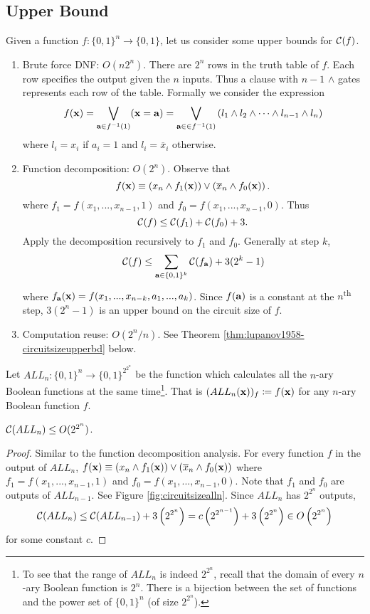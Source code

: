 \documentclass[11pt]{article}
\begin{document}
\subsection{Upper Bound}
\label{ssec:circuitsizeupperbd}
Given a function $f: \{0,1\}^n \rightarrow \{0,1\}$, let us consider some upper bounds for $\operatorname*{\mathcal{C}}(f)$.
\begin{enumerate}
	\item Brute force DNF: $O(n2^n)$. There are $2^n$ rows in the truth table of $f$. Each row specifies the output given the $n$ inputs. Thus a clause with $n-1$ $\land$ gates represents each row of the table. Formally we consider the expression
	\[f(\mathbf{x}) = \bigvee_{\mathbf{a} \in f^{-1}(1)} (\mathbf{x} = \mathbf{a}) = \bigvee_{\mathbf{a} \in  \in f^{-1}(1)} \left(l_1 \land l_2 \land \cdots \land l_{n-1} \land l_n\right)\]
	where $l_i = x_i$ if $a_i = 1$ and $l_i = \overline{x}_i$ otherwise.
	\item Function decomposition: $O(2^n)$. Observe that 
	\[f(\mathbf{x}) \equiv \left(x_n \land f_1(\mathbf{x})\right) \lor \left(\overline{x}_n \land f_0(\mathbf{x})\right).\]
	where $f_1 = f(x_1, ..., x_{n-1}, 1)$ and $f_0 = f(x_1, ..., x_{n-1}, 0)$. Thus
	\[\operatorname*{\mathcal{C}}(f) \leq \operatorname*{\mathcal{C}}(f_1) + \operatorname*{\mathcal{C}}(f_0) + 3.\]
	Apply the decomposition recursively to $f_1$ and $f_0$. Generally at step $k$,
	\[\operatorname*{\mathcal{C}}(f) \leq \sum_{\mathbf{a} \in \{0,1\}^k}\operatorname*{\mathcal{C}}(f_{\mathbf{a}}) + 3(2^k - 1)\]
	where $f_{\mathbf{a}}(\mathbf{x}) = f(x_1, ..., x_{n-k}, a_1, ..., a_k)$. Since $f(\mathbf{a})$ is a constant at the $n$\textsuperscript{th} step, $3(2^n - 1)$ is an upper bound on the circuit size of $f$. 
	\item Computation reuse: $O(2^n/n)$. See Theorem \ref{thm:lupanov1958-circuitsizeupperbd} below. 
\end{enumerate}

Let $ALL_n: \{0,1\}^n \rightarrow \{0,1\}^{2^{2^{n}}}$ be the function which calculates all the $n$-ary Boolean functions at the same time\footnote{To see that the range of $ALL_n$ is indeed $2^{2^{n}}$, recall that the domain of every $n$-ary Boolean function is $2^{n}$. There is a bijection between the set of functions and the power set of $\{0,1\}^n$ (of size $2^{2^{n}}$).}. That is $(ALL_n(\mathbf{x}))_f \coloneqq f(\mathbf{x})$ for any $n$-ary Boolean function $f$.

\begin{claim}
	\label{claim:upperbdalln}
	$\operatorname*{\mathcal{C}}(ALL_n) \leq O(2^{2^{n}})$.
\end{claim}
\begin{proof}
	Similar to the function decomposition analysis. For every function $f$ in the output of $ALL_n$, $f(\mathbf{x}) \equiv \left(x_n \land f_{1}(\mathbf{x})\right) \lor \left(\overline{x}_n \land f_{0}(\mathbf{x})\right)$ where $f_1 = f(x_1, ..., x_{n-1}, 1)$ and $f_0 = f(x_1, ..., x_{n-1}, 0)$. Note that $f_1$ and $f_0$ are outputs of $ALL_{n-1}$. See Figure \ref{fig:circuitsizealln}. Since $ALL_n$ has $2^{2^{n}}$ outputs,
	\[\operatorname*{\mathcal{C}}(ALL_n) \leq \operatorname*{\mathcal{C}}(ALL_{n-1}) + 3\left(2^{2^{n}}\right) = c\left(2^{2^{n-1}}\right) + 3\left(2^{2^{n}}\right) \in O\left(2^{2^{n}}\right)\]
	for some constant $c$. 
\end{proof}
\end{document}
